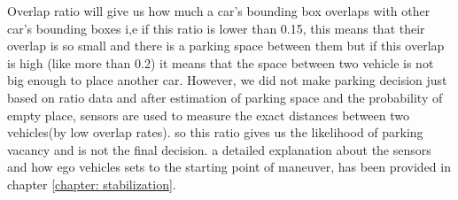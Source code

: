 Overlap ratio will give us how much a car's bounding box overlaps with other car's bounding boxes i,e if this ratio is lower than 0.15, this means that their overlap is so small and there is a parking space between them but if this overlap is high (like more than 0.2) it means that the space between two vehicle is not big enough to place another car. However, we did not make parking decision just based on ratio data and after estimation of parking space and the probability of empty place, sensors are used to measure the exact distances between two vehicles(by low overlap rates). so this ratio gives us the likelihood of parking vacancy and is not the final decision. a detailed explanation about the sensors and how ego vehicles sets to the starting point of maneuver, has been provided in chapter \ref{chapter: stabilization}.

